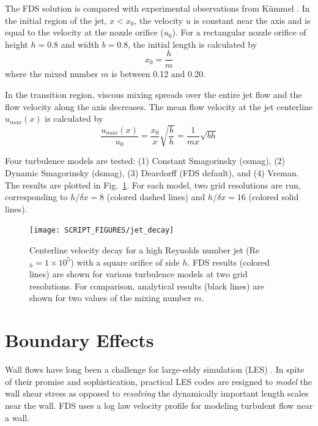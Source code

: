 \documentclass[11pt]{book}
\begin{document}
The FDS solution is compared with experimental observations from K\"ummel \cite{Kummel:2007}. In the initial region of the jet, $x<x_0$, the velocity $u$ is constant near the axis and is equal to the velocity at the nozzle orifice ($u_0$). For a rectangular nozzle orifice of height $h = 0.8$ and width $b = 0.8$, the initial length is calculated by
\begin{equation}
x_0 = \frac{h}{m}
\end{equation}
where the mixed number $m$ is between 0.12 and 0.20.

In the transition region, viscous mixing spreads over the entire jet flow and the flow velocity along the axis decreases. The mean flow velocity at the jet centerline $u_{max}(x)$ is calculated by
\begin{equation}
\frac{u_{max}(x)}{u_0} = \frac{x_0}{x}\sqrt{\frac{b}{h}} = \frac{1}{mx} \sqrt{bh}
\end{equation}

Four turbulence models are tested: (1) Constant Smagorinsky (csmag), (2) Dynamic Smagorinsky (dsmag), (3) Deardorff (FDS default), and (4) Vreman.  The results are plotted in Fig.~\ref{fig_jet_decay}. For each model, two grid resolutions are run, corresponding to $h/\delta x = 8$ (colored dashed lines) and $h/\delta x=16$ (colored solid lines).
\begin{figure}[h]
\centering
\texttt{[image: SCRIPT\_FIGURES/jet\_decay]}
\caption[Jet centerline velocity decay]{Centerline velocity decay for a high Reynolds number jet (Re$_h = 1 \times 10^5$) with a square orifice of side $h$.  FDS results (colored lines) are shown for various turbulence models at two grid resolutions.  For comparison, analytical results (black lines) are shown for two values of the mixing number $m$.}
\label{fig_jet_decay}
\end{figure}


\chapter{Boundary Effects}

Wall flows have long been a challenge for large-eddy simulation (LES) \cite{Baggett:1997,Baggett:1998,Cabot:1995,Pope:2000,Sagaut:2001}.  In spite of their promise and sophistication, practical LES codes are resigned to \emph{model} the wall shear stress as opposed to \emph{resolving} the dynamically important length scales near the wall. FDS uses a log law velocity profile \cite{Pope:2000} for modeling turbulent flow near a wall.
\end{document}
